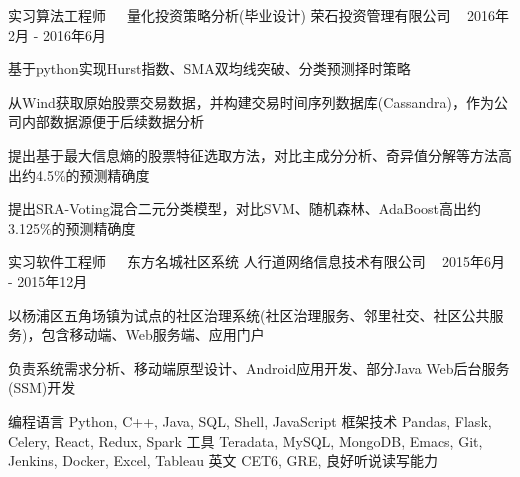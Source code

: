\documentclass[11pt, a4paper, UTF8]{awesome-cv}
\begin{document}
\begin{cventries}
  \cventry
    {实习算法工程师{\ \cdotp\ \ }量化投资策略分析(毕业设计)} %
    {荣石投资管理有限公司} %
    {\ } %
    {2016年2月 - 2016年6月} %
    {
      \begin{cvitems} %
        \item {基于python实现Hurst指数、SMA双均线突破、分类预测择时策略}
        \item {从Wind获取原始股票交易数据，并构建交易时间序列数据库(Cassandra)，作为公司内部数据源便于后续数据分析}
        \item {提出基于最大信息熵的股票特征选取方法，对比主成分分析、奇异值分解等方法高出约4.5\%的预测精确度}
        \item {提出SRA-Voting混合二元分类模型，对比SVM、随机森林、AdaBoost高出约3.125\%的预测精确度}
      \end{cvitems}
    }
    
  \cventry
    {实习软件工程师{\ \cdotp\ \ }东方名城社区系统} %
    {人行道网络信息技术有限公司} %
    {\ } %
    {2015年6月 - 2015年12月} %
    {
      \begin{cvitems} %
        \item {以杨浦区五角场镇为试点的社区治理系统(社区治理服务、邻里社交、社区公共服务)，包含移动端、Web服务端、应用门户}
        \item {负责系统需求分析、移动端原型设计、Android应用开发、部分Java Web后台服务(SSM)开发}
      \end{cvitems}
    }
    
\end{cventries}



%
\begin{cvskills}
  \cvskill
    {编程语言} %
    {Python, C++, Java, SQL, Shell, JavaScript} %
  \cvskill
    {框架技术} %
    {Pandas, Flask, Celery, React, Redux, Spark} %
  \cvskill
    {工具} %
    {Teradata, MySQL, MongoDB, Emacs, Git, Jenkins, Docker, Excel, Tableau} %
  \cvskill
    {英文} %
    {CET6, GRE, 良好听说读写能力} %
\end{cvskills}



%
%
%
%
%


\end{document}
